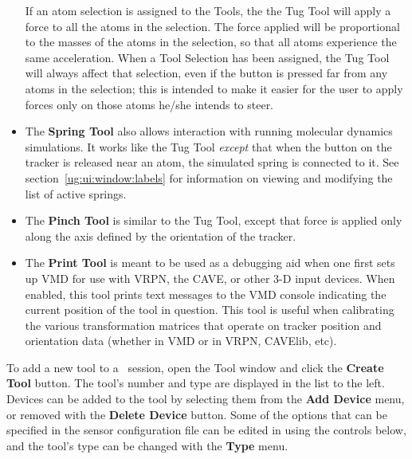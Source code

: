 \begin{itemize}
If an atom selection is assigned to the Tools,
the the Tug Tool will apply a force to 
all the atoms in the selection.  The force applied will be proportional to
the masses of the atoms in the selection, so that all atoms experience the
same acceleration.  When a Tool Selection has been assigned, the Tug Tool
will always affect that selection, even if the button is pressed far from
any atoms in the selection; this is intended to make it easier for the
user to apply forces only on those atoms he/she intends to steer. 

\item The {\bf Spring Tool} also allows interaction with running
molecular dynamics simulations.  It works like the Tug Tool {\sl
except\/} that when the button on the tracker is released near an
atom, the simulated spring is connected to it.  See
section~\ref{ug:ui:window:labels} for information on viewing and
modifying the list of active springs.

\item The {\bf Pinch Tool} is similar to the Tug Tool, except that
force is applied only along the axis defined by the orientation of the
tracker.

\item The {\bf Print Tool} is meant to be used as a debugging aid when
one first sets up VMD for use with VRPN, the CAVE, or other 3-D input
devices.  When enabled, this tool prints text messages to the VMD console
indicating the current position of the tool in question.  This tool is 
useful when calibrating the various transformation matrices that operate on 
tracker position and orientation data (whether in VMD or in VRPN, CAVElib, 
etc).

\end{itemize}
To add a new tool to a \VMD\ session, open the {\sf Tool} window and click
the {\bf Create Tool\/} button.  The tool's number and type are
displayed in the list to the left.  Devices can be added to the tool
by selecting them from the {\bf Add Device\/} menu, or removed with
the {\bf Delete Device\/} button.  Some of the options that can be
specified in the sensor configuration file can be edited in using the
controls below, and the tool's type can be changed with the {\bf
Type\/} menu.

